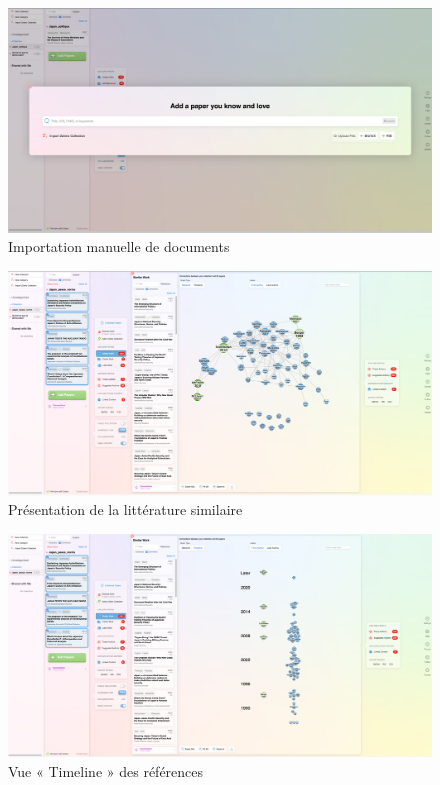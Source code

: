 \documentclass[
  letterpaper,
]{scrbook}
\begin{document}
\begin{figure}

{\centering \includegraphics{images/chapitre9_rr2.png}

}

\caption{\label{fig-rr2}Importation manuelle de documents}

\end{figure}

\begin{figure}

{\centering \includegraphics{images/chapitre9_RR3.png}

}

\caption{\label{fig-rr3}Présentation de la littérature similaire}

\end{figure}

\begin{figure}

{\centering \includegraphics{images/chapitre9_rr4.png}

}

\caption{\label{fig-rr4}Vue « Timeline » des références}

\end{figure}
\end{document}
